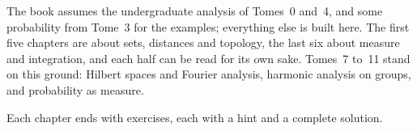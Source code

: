 The book assumes the undergraduate analysis of Tomes~0 and~4, and some probability from Tome~3 for the examples; everything else is built here. The first five chapters are about sets, distances and topology, the last six about measure and integration, and each half can be read for its own sake. Tomes~7 to~11 stand on this ground: Hilbert spaces and Fourier analysis, harmonic analysis on groups, and probability as measure.

Each chapter ends with exercises, each with a hint and a complete solution.
